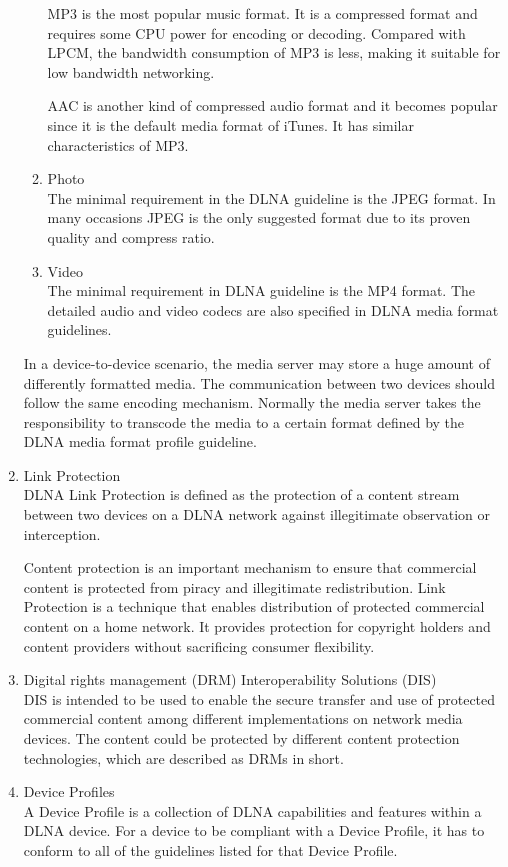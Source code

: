 \begin{enumerate}
\begin{enumerate}
MP3 is the most popular music format. It is a compressed format and requires 
some CPU power for encoding or decoding. Compared with LPCM, the bandwidth consumption of MP3 is less, making it suitable for low bandwidth networking. 

AAC is another kind of compressed audio format and it becomes popular since it is the default media format of iTunes. It has similar characteristics of MP3. 
\item Photo \\ 
The minimal requirement in the DLNA guideline is the JPEG format. In many occasions JPEG is the only suggested format due to its proven quality and compress ratio. 
\item Video \\ 
The minimal requirement in DLNA guideline is the MP4 format. The detailed audio and video codecs are also specified in DLNA media format guidelines. 
\end{enumerate} 
In a device-to-device scenario, the media server may store a huge amount of differently 
formatted media. The communication between two devices should follow the same encoding mechanism. Normally the media server takes the responsibility to transcode the media to a certain format defined by the DLNA media format profile guideline. 
\item Link Protection \\ 
DLNA Link Protection is defined as the protection of a content stream between two 
devices on a DLNA network against illegitimate observation or interception. 

Content protection is an important mechanism to ensure that commercial content is protected 
from piracy and illegitimate redistribution. Link Protection is a technique that enables 
distribution of protected commercial content on a home network. It provides protection for copyright holders and content providers without sacrificing consumer flexibility. 
\item Digital rights management (DRM) Interoperability Solutions (DIS) \\ 
DIS is intended to be used to enable the secure transfer and use of protected 
commercial content among different implementations on network media devices. 
The content could be protected by different content protection technologies, 
which are described as DRMs in short. 
\item Device Profiles \\ 
A Device Profile is a collection of DLNA capabilities and features within a DLNA device. For a device 
to be compliant with a Device Profile, it has to conform to all of the guidelines listed for that 
Device Profile. 


\end{enumerate}
